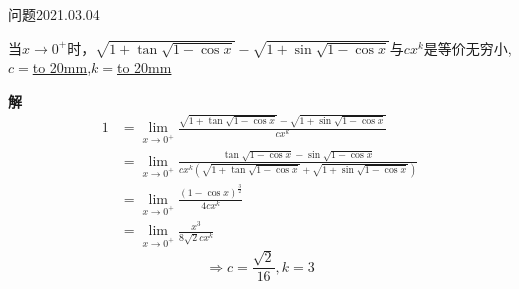 \begin{mybox}{问题2021.03.04}
	
	\qquad 当$x\to 0^+$时，$\sqrt{1+\tan \sqrt{1-\cos x}}-\sqrt{1+\sin \sqrt{1-\cos x}}$与$cx^k$是等价无穷小,$c=$\underline{\hbox to 20mm{}},$k=$\underline{\hbox to 20mm{}}
\end{mybox}
\noindent
\textbf{解}
\begin{align*}
	1&=\lim\limits_{x \to 0^+} \frac{\sqrt{1+\tan \sqrt{1-\cos x}}-\sqrt{1+\sin \sqrt{1-\cos x}}}{cx^k}\\
	&=\lim\limits_{x \to 0^+} \frac{\tan \sqrt{1-\cos x}-\sin \sqrt{1-\cos x}}{cx^k(\sqrt{1+\tan \sqrt{1-\cos x}}+\sqrt{1+\sin \sqrt{1-\cos x}})}\\
	&=\lim\limits_{x \to 0^+} \frac{(1-\cos x)^{\frac{3}{2}}}{4cx^k}\\
	&=\lim \limits_{x\to 0^+} \frac{x^3}{8\sqrt{2} cx^k}
\end{align*}
$$\Rightarrow c=\frac{\sqrt{2}}{16},k=3$$